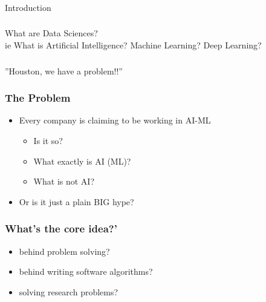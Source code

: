 \begin{frame}[fragile]\frametitle{}
\begin{center}
{\Large Introduction}
\end{center}
\end{frame}


\begin{frame}[fragile]\frametitle{}
\begin{center}
{\Large What are Data Sciences? \\ \small ie What is Artificial Intelligence? Machine Learning? Deep Learning?}
\end{center}
\end{frame}

\begin{frame}[fragile]\frametitle{}
\begin{center}
{\Large ''Houston, we have a problem!!''}
\end{center}
\end{frame}

\begin{frame}[fragile]\frametitle{The Problem}

\begin{itemize}
\item Every company is claiming to be working in AI-ML
\begin{itemize}
\item Is it so?
\item What exactly is AI (ML)?
\item What is not AI?
\end{itemize}

\item Or is it just a plain BIG hype?

\end{itemize}
	  
\end{frame}


\begin{frame}[fragile]\frametitle{What's the core idea?'}
\begin{itemize}
\item behind problem solving?
\item behind writing software algorithms?
\item solving research problems?
\end{itemize}
\end{frame}

